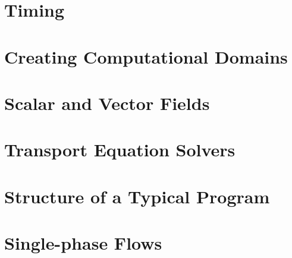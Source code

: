 \documentclass[a4paper]{book}
\begin{document}
  \chapter{Timing {\psiboil}}
  
  
  

  \chapter{Creating Computational Domains}
  
  
  
  
  
  

  \chapter{Scalar and Vector Fields}
  
  
  

  \chapter{Transport Equation Solvers}
    
    
   
  

  \chapter{Structure of a Typical {\psiboil} Program}
    

  \chapter{Single-phase Flows} 
  
  
  
  
\end{document}
